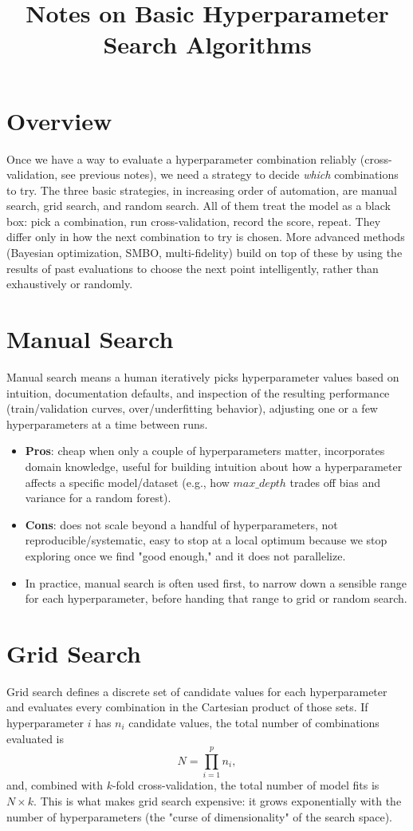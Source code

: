 \documentclass[conference]{IEEEtran}
\title{Notes on Basic Hyperparameter Search Algorithms}
\author{
\IEEEauthorblockN{Luis Mendez}
}
\begin{document}
\maketitle

\section*{Overview}
Once we have a way to evaluate a hyperparameter combination reliably (cross-validation, see previous notes), we need a strategy to decide \textit{which} combinations to try. The three basic strategies, in increasing order of automation, are manual search, grid search, and random search. All of them treat the model as a black box: pick a combination, run cross-validation, record the score, repeat. They differ only in how the next combination to try is chosen. More advanced methods (Bayesian optimization, SMBO, multi-fidelity) build on top of these by using the results of past evaluations to choose the next point intelligently, rather than exhaustively or randomly.

\section*{Manual Search}
Manual search means a human iteratively picks hyperparameter values based on intuition, documentation defaults, and inspection of the resulting performance (train/validation curves, over/underfitting behavior), adjusting one or a few hyperparameters at a time between runs.
\begin{itemize}
    \item \textbf{Pros}: cheap when only a couple of hyperparameters matter, incorporates domain knowledge, useful for building intuition about how a hyperparameter affects a specific model/dataset (e.g., how $max\_depth$ trades off bias and variance for a random forest).
    \item \textbf{Cons}: does not scale beyond a handful of hyperparameters, not reproducible/systematic, easy to stop at a local optimum because we stop exploring once we find "good enough," and it does not parallelize.
    \item In practice, manual search is often used first, to narrow down a sensible range for each hyperparameter, before handing that range to grid or random search.
\end{itemize}

\section*{Grid Search}
Grid search defines a discrete set of candidate values for each hyperparameter and evaluates every combination in the Cartesian product of those sets. If hyperparameter $i$ has $n_i$ candidate values, the total number of combinations evaluated is
\begin{equation}
    N = \prod_{i=1}^{p} n_i,
\end{equation}
and, combined with $k$-fold cross-validation, the total number of model fits is $N \times k$. This is what makes grid search expensive: it grows exponentially with the number of hyperparameters (the "curse of dimensionality" of the search space).
\end{document}
